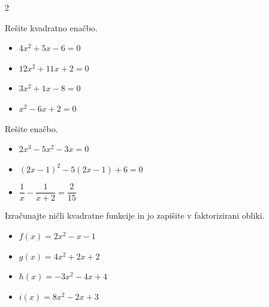             \begin{multicols}{2}
            \begin{naloga}
                Rešite kvadratno enačbo.
                
                    \begin{itemize}
                        \item $ 4x^2+5x-6=0 $ 
                        \item $ 12x^2+11x+2=0 $ 
                        \item $ 3x^2+1x-8=0 $ 
                        \item $ x^2-6x+2=0 $
                    \end{itemize}

            \end{naloga}

            \begin{naloga}
                Rešite enačbo.
                
                    \begin{itemize}
                        \item $ 2x^3-5x^2-3x=0 $ 
                        \item $ \left(2x-1\right)^2-5\left(2x-1\right)+6=0 $ 
                        \item $ \dfrac{1}{x}-\dfrac{1}{x+2}=\dfrac{2}{15} $ 
                    \end{itemize}

            \end{naloga}


            \end{multicols}


    

        \begin{naloga}
                Izračunajte ničli kvadratne funkcije in jo zapišite v faktorizirani obliki.
                
                    \begin{itemize}
                        \item $ f(x)=2x^2-x-1 $ 
                        \item $ g(x)=4x^2+2x+2 $ 
                        \item $ h(x)=-3x^2-4x+4 $ 
                        \item $ i(x)=8x^2-2x+3 $ 
                    \end{itemize}

            \end{naloga}


